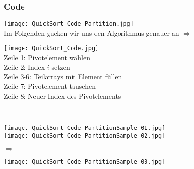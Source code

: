 		
		\subsubsection{Code}
			\begin{minipage}[t]{0.5\textwidth}
				\begin{center}
					\texttt{[image: QuickSort\_Code\_Partition.jpg]} \\ \vspace{0.5cm}
					Im Folgenden gucken wir uns den Algorithmus genauer an $\Rightarrow$ \\ \vspace{0.5cm}
				\end{center}
			\end{minipage}
			\begin{minipage}[t]{0.45\textwidth}
				\begin{center}
					\texttt{[image: QuickSort\_Code.jpg]} \\ \vspace{0.5cm}
					Zeile 1: Pivotelement wählen \\
					Zeile 2: Index $i$ setzen \\
					Zeile 3-6: Teilarrays mit Element füllen \\
					Zeile 7: Pivotelement tauschen \\
					Zeile 8: Neuer Index des Pivotelements \\ \vspace{0.9cm}
				\end{center}
			\end{minipage} \\
		
			\begin{minipage}{0.5\textwidth}
				\begin{center}
					\texttt{[image: QuickSort\_Code\_PartitionSample\_01.jpg]} \\
					\texttt{[image: QuickSort\_Code\_PartitionSample\_02.jpg]} \\
				\end{center}
			\end{minipage}
			\begin{minipage}{0.05\textwidth}
				\begin{center}
					$\Rightarrow$
				\end{center}
			\end{minipage}
			\begin{minipage}{0.45\textwidth}
				\begin{center}
					\texttt{[image: QuickSort\_Code\_PartitionSample\_00.jpg]} \\
				\end{center}
			\end{minipage}
		

